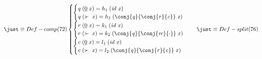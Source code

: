\documentclass[a4paper]{article}
\newcommand{\Varid}[1]{\mathit{#1}}
\begin{document}
\begin{eqnarray*}
\just\equiv{ Def-comp (72)}

\begin{cases}
    \begin{cases}
	    \ensuremath{\Varid{q}\;(\underline{\mathrm{0}}\;\Varid{x})\mathrel{=}h_1 \;(\Varid{id}\;\Varid{x})}\\
        \ensuremath{\Varid{q}\;(\succ \;\Varid{x})\mathrel{=}h_2 \;(\conj{\Varid{q}}{\conj{\Varid{r}}{\Varid{c}}}\;\Varid{x})} 
    \end{cases} \\
    \begin{cases}
        \ensuremath{\Varid{r}\;(\underline{\mathrm{0}}\;\Varid{x})\mathrel{=}k_1 \;(\Varid{id}\;\Varid{x})}\\ 
        \ensuremath{\Varid{r}\;(\succ \;\Varid{x})\mathrel{=}k_2 \;(\conj{\Varid{q}}{\conj{\Varid{rc}}{\cdot }}\;\Varid{x})} 
    \end{cases} \\
    \begin{cases}
        \ensuremath{\Varid{c}\;(\underline{\mathrm{0}}\;\Varid{x})\mathrel{=}l_1 \;(\Varid{id}\;\Varid{x})}\\
        \ensuremath{\Varid{c}\;(\succ \;\Varid{x})\mathrel{=}l_2 \;(\conj{\Varid{q}}{\conj{\Varid{r}}{\Varid{c}}}\;\Varid{x})}
    \end{cases}
\end{cases}

\just\equiv{ Def-split (76)}


\end{eqnarray*}
\end{document}

